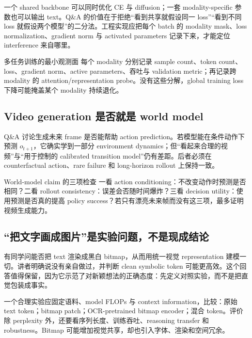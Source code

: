 \documentclass[a4paper]{article}
\begin{document}
一个 shared backbone 可以同时优化 CE 与 diffusion；一套 modality-specific 参数也可以输出 text。Q\&A 的价值在于拒绝“看到共享就假设同一 loss”“看到不同 loss 就假设两个模型”的二分法。工程实现应把每个 batch 的 modality mask、loss normalization、gradient norm 与 activated parameters 记录下来，才能定位 interference 来自哪里。

\begin{importantbox}{多任务训练的最小观测面}
每个 modality 分别记录 sample count、token count、loss、gradient norm、active parameters、吞吐与 validation metric；再记录跨 modality 的 attention/representation probe。没有这些分解，global training loss 下降可能掩盖某个 modality 持续退化。
\end{importantbox}

\subsection{Video generation 是否就是 world model}

Q\&A 讨论生成未来 frame 是否能帮助 action prediction。若模型能在条件动作下预测 $o_{t+1}$，它确实学到一部分 environment dynamics；但“看起来合理的视频”与“用于控制的 calibrated transition model”仍有差距。后者必须在 counterfactual action、rare failure 和 long-horizon rollout 上保持一致。


\begin{warningbox}{World-model claim 的三项检查}
一看 action conditioning：不改变动作时预测是否相同？二看 rollout consistency：误差会否随时间爆炸？三看 decision utility：使用预测是否真的提高 policy success？若只有漂亮未来帧而没有这三项，最多证明视频生成能力。
\end{warningbox}

\subsection{“把文字画成图片”是实验问题，不是现成结论}

有同学问能否把 text 渲染成黑白 bitmap，从而用统一视觉 representation 建模一切。讲者明确说没有亲自做过，并判断 clean symbolic token 可能更高效。这个回答值得保留，因为它示范了对新颖想法的正确态度：先定义对照实验，而不是把直觉包装成事实。

一个合理实验应固定语料、model FLOPs 与 context information，比较：原始 text token；bitmap patch；OCR-pretrained bitmap encoder；混合 token。评价除 perplexity 外，还要看序列长度、训练吞吐、reasoning transfer 和 robustness。Bitmap 可能增加视觉共享，却也引入字体、渲染和空间冗余。
\end{document}
